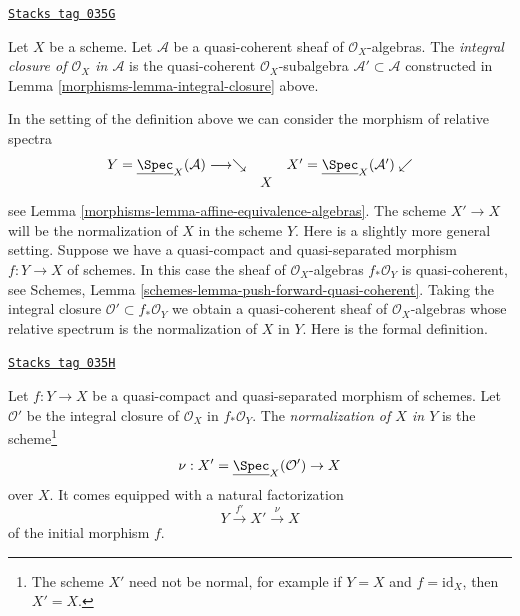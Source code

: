 \begin{definition}
\label{morphisms-definition-integral-closure}
\href{https://stacks.math.columbia.edu/tag/035G}{\texttt{Stacks tag 035G}}

Let $X$ be a scheme. Let $\mathcal{A}$ be a quasi-coherent sheaf
of $\mathcal{O}_X$-algebras. The {\it integral closure of $\mathcal{O}_X$
in $\mathcal{A}$} is the quasi-coherent $\mathcal{O}_X$-subalgebra
$\mathcal{A}' \subset \mathcal{A}$ constructed in
Lemma \ref{morphisms-lemma-integral-closure} above.
\end{definition}

In the setting of the definition above we can consider the morphism
of relative spectra
$$
\begin{array}{ccc}Y = \underline{\Spec}_X(\mathcal{A}) \longrightarrow\searrow &  & X' = \underline{\Spec}_X(\mathcal{A}') \swarrow \\  & X & \end{array}
$$
see Lemma \ref{morphisms-lemma-affine-equivalence-algebras}.
The scheme $X' \to X$ will be the normalization of $X$ in the scheme $Y$.
Here is a slightly more general setting. Suppose we have a
quasi-compact and quasi-separated morphism $f : Y \to X$
of schemes. In this case the sheaf of
$\mathcal{O}_X$-algebras $f_*\mathcal{O}_Y$ is quasi-coherent, see
Schemes, Lemma \ref{schemes-lemma-push-forward-quasi-coherent}.
Taking the integral closure $\mathcal{O}' \subset f_*\mathcal{O}_Y$
we obtain a quasi-coherent sheaf of $\mathcal{O}_X$-algebras
whose relative spectrum is the normalization of $X$ in $Y$. Here is
the formal definition.

\begin{definition}[Normalization X in Y]
\label{morphisms-definition-normalization-X-in-Y}
\href{https://stacks.math.columbia.edu/tag/035H}{\texttt{Stacks tag 035H}}

Let $f : Y \to X$ be a quasi-compact and quasi-separated morphism of schemes.
Let $\mathcal{O}'$ be the integral closure of $\mathcal{O}_X$ in
$f_*\mathcal{O}_Y$. The {\it normalization of $X$ in $Y$} is the
scheme\footnote{The scheme $X'$ need not be normal, for example if
$Y = X$ and $f = \text{id}_X$, then $X' = X$.}
$$
\nu : X' = \underline{\Spec}_X(\mathcal{O}') \to X
$$
over $X$. It comes equipped with a natural factorization
$$
Y \xrightarrow{f'} X' \xrightarrow{\nu} X
$$
of the initial morphism $f$.
\end{definition}

